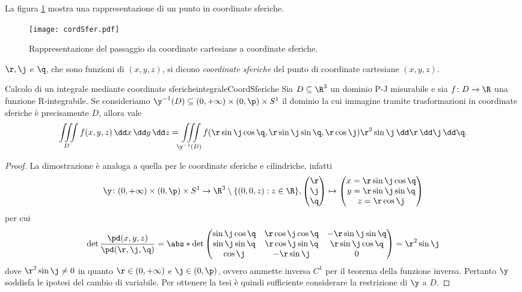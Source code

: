 \begin{oss}
	La figura \ref{fig:cordSfer} mostra una rappresentazione di un punto in coordinate sferiche.
\end{oss}

\begin{figure}[tp]
	\begin{centering}
		\texttt{[image: cordSfer.pdf]}
		\caption{Rappresentazione del passaggio da coordinate cartesiane a coordinate sferiche.}
		\label{fig:cordSfer}
	\end{centering}
\end{figure}

\begin{notz}
	\(\r,\j\) e \(\q\), che sono funzioni di \((x,y,z)\), si dicono \emph{coordinate sferiche} del punto di coordinate cartesiane \((x,y,z)\).
\end{notz}

\begin{prop}{Calcolo di un integrale mediante coordinate sferiche}{integraleCoordSferiche}
	Sia \(D\subseteq\R^3\) un dominio P-J misurabile e sia \(f\colon D\to\R\) una funzione R-integrabile.
	Se consideriamo \(\y^{-1}(D)\subseteq (0,+\infty)\times (0,\p)\times S^1\) il dominio la cui immagine tramite trasformazioni in coordinate sferiche è precisamente \(D\), allora vale
	\[
		\iiint\limits_D f(x,y,z)\,\dd x\,\dd y\,\dd z = \iiint\limits_{\y^{-1}(D)} f(\r\sin\j \cos\q,\r\sin\j \sin\q,\r \cos \j)\r^2\sin\j\,\dd \r\,\dd \j\,\dd \q.
	\]
\end{prop}

\begin{proof}
	La dimostrazione è analoga a quella per le coordinate sferiche e cilindriche, infatti
	\[
		\y\colon (0,+\infty)\times (0,\p)\times S^1 \to \R^3\setminus \{(0,0,z):z\in\R\},	\begin{pmatrix}
			\r \\
			\j \\
			\q
		\end{pmatrix}
		\mapsto	\begin{pmatrix}
			x = \r \sin \j \cos \q \\
			y = \r \sin \j \sin \q \\
			z = \r \cos \j
		\end{pmatrix}
	\]
	per cui
	\[
		\det \frac{\pd(x,y,z)}{\pd(\r,\j,\q)} = \abs*{\det 	\begin{pmatrix}
				\sin\j \cos\q & \r \cos\j \cos\q & -\r \sin\j \sin\q \\
				\sin\j \sin\q & \r \cos\j \sin\q & \r \sin\j \cos\q  \\
				\cos\j        & -\r \sin\j       & 0
			\end{pmatrix}}
		= \r^2 \sin\j
	\]
	dove \(\r^2 \sin\j\neq 0\) in quanto \(\r\in(0,+\infty)\) e \(\j\in (0,\p)\), ovvero ammette inversa \(C^1\) per il teorema della funzione inversa.
	Pertanto \(\y\) soddisfa le ipotesi del cambio di variabile.
	Per ottenere la tesi è quindi sufficiente considerare la restrizione di \(\y\) a \(D\).
\end{proof}

